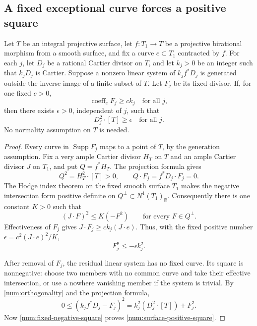 \subsection{A fixed exceptional curve forces a positive square}

\begin{lemma}\label{num:fixed-square}
Let \(T\) be an integral projective surface, let
\(f:T_1\to T\) be a projective birational morphism from a smooth
surface, and fix a curve \(e\subset T_1\) contracted by \(f\).
For each \(j\), let \(D_j\) be a rational Cartier divisor on
\(T\), and let \(k_j>0\) be an integer such that \(k_jD_j\)
is Cartier.  Suppose a nonzero linear system of
\(k_jf^*D_j\) is generated outside the inverse image of a finite
subset of \(T\).  Let \(F_j\) be its fixed divisor.
If, for one fixed \(c>0\),
\[
\operatorname{coeff}_e F_j\geq ck_j
\quad\text{for all }j,
\]
then there exists \(\epsilon>0\), independent of \(j\), such that
\begin{equation}\label{num:surface-positive-square}
D_j^2\cdot[T]\geq\epsilon
\quad\text{for all }j.
\end{equation}
No normality assumption on \(T\) is needed.
\end{lemma}

\begin{proof}
Every curve in \(\operatorname{Supp}F_j\) maps to a point of
\(T\), by the generation assumption.  Fix a very ample Cartier
divisor \(H_T\) on \(T\) and an ample Cartier divisor \(J\) on
\(T_1\), and put \(Q=f^*H_T\).  The projection formula gives
\begin{equation}\label{num:orthogonality}
Q^2=H_T^2\cdot[T]>0,
\qquad Q\cdot F_j=f^*D_j\cdot F_j=0.
\end{equation}
The Hodge index theorem on the fixed smooth surface \(T_1\)
\cite[Chapter~V, Section~1]{Hartshorne77} makes the negative intersection
form positive definite on
\(Q^\perp\subset N^1(T_1)_{\mathbb R}\).  Consequently there
is one constant \(K>0\) such that
\[
(J\cdot F)^2\leq K(-F^2)
\qquad\text{for every }F\in Q^\perp.
\]
Effectiveness of \(F_j\) gives
\(J\cdot F_j\geq ck_j(J\cdot e)\).  Thus, with the fixed
positive number \(\epsilon=c^2(J\cdot e)^2/K\),
\begin{equation}\label{num:fixed-negative-square}
F_j^2\leq-\epsilon k_j^2.
\end{equation}

After removal of \(F_j\), the residual linear system has no
fixed curve.  Its square is nonnegative: choose two members
with no common curve and take their effective intersection,
or use a nowhere vanishing member if the system is trivial.
By \eqref{num:orthogonality} and the projection formula,
\[
0\leq(k_jf^*D_j-F_j)^2
=k_j^2(D_j^2\cdot[T])+F_j^2.
\]
Now \eqref{num:fixed-negative-square} proves
\eqref{num:surface-positive-square}.
\end{proof}

